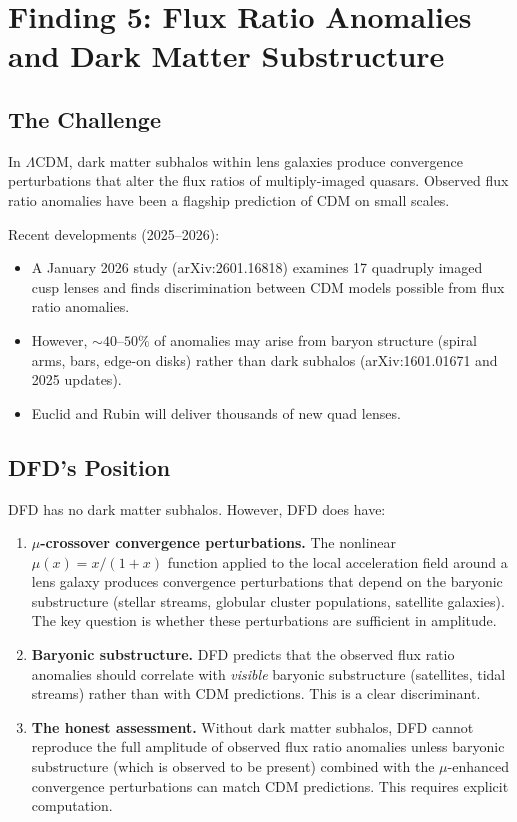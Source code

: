 \documentclass[11pt,a4paper]{article}
\newcommand{\LCDM}{$\Lambda$CDM}
\begin{document}
\section{Finding 5: Flux Ratio Anomalies and Dark Matter Substructure}
\label{sec:substructure}

\subsection{The Challenge}

In \LCDM, dark matter subhalos within lens galaxies produce
convergence perturbations that alter the flux ratios of
multiply-imaged quasars.  Observed flux ratio anomalies
have been a flagship prediction of CDM on small scales.

Recent developments (2025--2026):
\begin{itemize}
\item A January 2026 study (arXiv:2601.16818) examines
  17 quadruply imaged cusp lenses and finds discrimination
  between CDM models possible from flux ratio anomalies.
\item However, $\sim 40$--$50\%$ of anomalies may arise from
  baryon structure (spiral arms, bars, edge-on disks) rather
  than dark subhalos (arXiv:1601.01671 and 2025 updates).
\item Euclid and Rubin will deliver thousands of new quad lenses.
\end{itemize}

\subsection{DFD's Position}

DFD has no dark matter subhalos.  However, DFD does have:
\begin{enumerate}
\item \textbf{$\mu$-crossover convergence perturbations.}
  The nonlinear $\mu(x) = x/(1+x)$ function applied to
  the local acceleration field around a lens galaxy produces
  convergence perturbations that depend on the baryonic
  substructure (stellar streams, globular cluster populations,
  satellite galaxies).  The key question is whether these
  perturbations are sufficient in amplitude.

\item \textbf{Baryonic substructure.}
  DFD predicts that the observed flux ratio anomalies should
  correlate with \emph{visible} baryonic substructure
  (satellites, tidal streams) rather than with CDM predictions.
  This is a clear discriminant.

\item \textbf{The honest assessment.}
  Without dark matter subhalos, DFD cannot reproduce the
  full amplitude of observed flux ratio anomalies unless
  baryonic substructure (which is observed to be present)
  combined with the $\mu$-enhanced convergence perturbations
  can match CDM predictions.  This requires explicit
  computation.
\end{enumerate}
\end{document}
